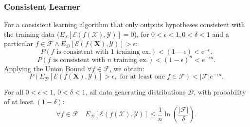 \subsubsection{Consistent Learner}
For a consistent learning algorithm that only outputs hypotheses consistent
with the training data ($E_\mathcal{S}\left[
\mathcal{E}(f(\mathcal{X}),\mathcal{Y}) \right]=0$), for
$0<\epsilon<1,0<\delta<1$ and a particular $f \in \mathcal{F}\wedge
E_\mathcal{D}\left[ \mathcal{E}\left( f(\mathcal{\mathbf{X}}),\mathcal{Y}
\right) \right]>\epsilon$:
\[P(f\text{ is consistent with 1 training ex.})<(1-\epsilon)<e^{-\epsilon}.\] 
\[P(f\text{ is consistent with $n$ training ex.})<{(1-\epsilon)}^{n}<e^{-\epsilon n}.\] 
Applying the Union Bound $\forall f \in \mathcal{F}$, we obtain:
\[P\left( E_\mathcal{D}\left[ \mathcal{E}\left( f(\mathbf{X}),\mathcal{Y} \right) \right]>\epsilon, \text{ for at least one $f \in \mathcal{F}$}\right)<\left| \mathcal{F} \right|e^{-\epsilon n}.\] 
\begin{theorem}
  For all $0<\epsilon<1$, $0<\delta<1$, all data generating distributions $\mathcal{D}$, with
  probability of at least $(1-\delta)$:
  \[\forall f \in \mathcal{F}\quad E_\mathcal{D}\left[ \mathcal{E}\left( f(\mathbf{\mathcal{X}}),\mathcal{Y} \right) \right]\le \frac{1}{n}\ln\left( \frac{\left| \mathcal{F} \right|}{\delta}  \right).\] 
\end{theorem}

